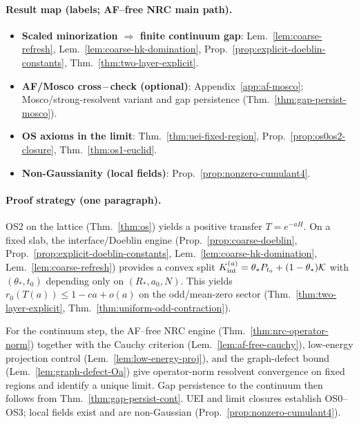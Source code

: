 \documentclass[11pt]{amsart}
\theoremstyle{plain}
\theoremstyle{definition}
\theoremstyle{remark}
\begin{document}
\paragraph{Result map (labels; AF--free NRC main path).}
\begin{itemize}
  \item \textbf{Scaled minorization $\Rightarrow$ finite continuum gap}: Lem.~\ref{lem:coarse-refresh}, Lem.~\ref{lem:coarse-hk-domination}, Prop.~\ref{prop:explicit-doeblin-constants}, Thm.~\ref{thm:two-layer-explicit}.
  \item \textbf{AF/Mosco cross\,–\,check (optional)}: Appendix~\ref{app:af-mosco}; Mosco/strong-resolvent variant and gap persistence (Thm.~\ref{thm:gap-persist-mosco}).
  \item \textbf{OS axioms in the limit}: Thm.~\ref{thm:uei-fixed-region}, Prop.~\ref{prop:os0os2-closure}, Thm.~\ref{thm:os1-euclid}.
  \item \textbf{Non-Gaussianity (local fields)}: Prop.~\ref{prop:nonzero-cumulant4}.
\end{itemize}

\paragraph{Proof strategy (one paragraph).}
OS2 on the lattice (Thm.~\ref{thm:os}) yields a positive transfer $T=e^{-aH}$. On a fixed slab, the interface/Doeblin engine (Prop.~\ref{prop:coarse-doeblin}, Prop.~\ref{prop:explicit-doeblin-constants}, Lem.~\ref{lem:coarse-hk-domination}, Lem.~\ref{lem:coarse-refresh}) provides a convex split $K_{\rm int}^{(a)}=\theta_* P_{t_0}+(1-\theta_*)\mathcal K$ with $(\theta_*,t_0)$ depending only on $(R_*,a_0,N)$. This yields $r_0(T(a))\le 1-c a+o(a)$ on the odd/mean-zero sector (Thm.~\ref{thm:two-layer-explicit}, Thm.~\ref{thm:uniform-odd-contraction}).

For the continuum step, the AF--free NRC engine (Thm.~\ref{thm:nrc-operator-norm}) together with the Cauchy criterion (Lem.~\ref{lem:af-free-cauchy}), low-energy projection control (Lem.~\ref{lem:low-energy-proj}), and the graph-defect bound (Lem.~\ref{lem:graph-defect-Oa}) give operator-norm resolvent convergence on fixed regions and identify a unique limit. Gap persistence to the continuum then follows from Thm.~\ref{thm:gap-persist-cont}. UEI and limit closures establish OS0--OS3; local fields exist and are non-Gaussian (Prop.~\ref{prop:nonzero-cumulant4}).
\end{document}
